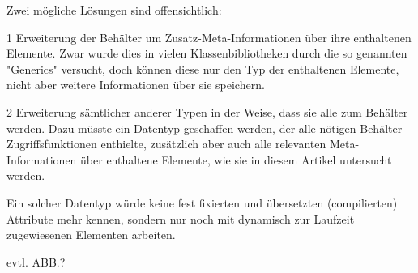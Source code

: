 Zwei mögliche Lösungen sind offensichtlich:

1 Erweiterung der Behälter um Zusatz-Meta-Informationen über ihre enthaltenen Elemente.
Zwar wurde dies in vielen Klassenbibliotheken durch die so genannten "Generics"
versucht, doch können diese nur den Typ der enthaltenen Elemente, nicht aber
weitere Informationen über sie speichern.

2 Erweiterung sämtlicher anderer Typen in der Weise, dass sie alle zum Behälter werden.
Dazu müsste ein Datentyp geschaffen werden, der alle nötigen Behälter-Zugriffsfunktionen
enthielte, zusätzlich aber auch alle relevanten Meta-Informationen über
enthaltene Elemente, wie sie in diesem Artikel untersucht werden.

Ein solcher Datentyp würde keine fest fixierten und übersetzten (compilierten)
Attribute mehr kennen, sondern nur noch mit dynamisch zur Laufzeit
zugewiesenen Elementen arbeiten.

evtl. ABB.?
